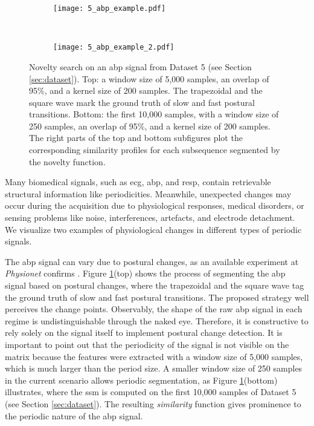 \begin{figure}
    \centering
    \begin{subfigure}[b]{\textwidth}
         \centering
         \texttt{[image: 5\_abp\_example.pdf]}
    \end{subfigure}\\
    \vspace{5mm}
    \begin{subfigure}[b]{\textwidth}
         \centering
         \texttt{[image: 5\_abp\_example\_2.pdf]}
    \end{subfigure}
    \caption{Novelty search on an \gls{abp} signal from Dataset 5 (see Section \ref{sec:dataset}). Top: a window size of 5,000 samples, an overlap of 95\%, and a kernel size of 200 samples. The trapezoidal and the square wave mark the ground truth of slow and fast postural transitions. Bottom: the first 10,000 samples, with a window size of 250 samples, an overlap of 95\%, and a kernel size of 200 samples. The right parts of the top and bottom subfigures plot the corresponding similarity profiles for each subsequence segmented by the novelty function.}
    \label{fig:use_case2}
\end{figure}


Many biomedical signals, such as \gls{ecg}, \gls{abp}, and \gls{resp}, contain retrievable structural information like periodicities. Meanwhile, unexpected changes may occur during the acquisition due to physiological responses, medical disorders, or sensing problems like noise, interferences, artefacts, and electrode detachment. We visualize two examples of physiological changes in different types of periodic signals.

The \gls{abp} signal can vary due to postural changes, as an available experiment at \textit{Physionet} confirms \cite{tilt, PhBank}. Figure \ref{fig:use_case2}(top) shows the process of segmenting the \gls{abp} signal based on postural changes, where the trapezoidal and the square wave tag the ground truth of slow and fast postural transitions. The proposed strategy well perceives the change points. Observably, the shape of the raw \gls{abp} signal in each regime is undistinguishable through the naked eye. Therefore, it is constructive to rely solely on the signal itself to implement postural change detection. It is important to point out that the periodicity of the signal is not visible on the matrix because the features were extracted with a window size of 5,000 samples, which is much larger than the period size. A smaller window size of 250 samples in the current scenario allows periodic segmentation, as Figure \ref{fig:use_case2}(bottom) illustrates, where the \gls{ssm} is computed on the first 10,000 samples of Dataset 5 (see Section \ref{sec:dataset}).
The resulting \textit{similarity} function gives prominence to the periodic nature of the \gls{abp} signal.

